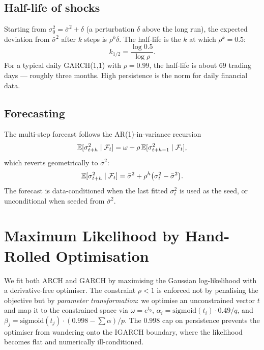 \subsection{Half-life of shocks}

Starting from $\sigma_0^2 = \bar\sigma^2 + \delta$ (a perturbation $\delta$
above the long run), the expected deviation from $\bar\sigma^2$ after $k$
steps is $\rho^k \delta$. The half-life is the $k$ at which $\rho^k = 0.5$:
\[
k_{1/2} = \frac{\log 0.5}{\log \rho}.
\]
For a typical daily GARCH(1,1) with $\rho = 0.99$, the half-life is about
$69$ trading days --- roughly three months. High persistence is the norm for
daily financial data.

\subsection{Forecasting}

The multi-step forecast follows the AR(1)-in-variance recursion
\[
\mathbb{E}[\sigma_{t+h}^2 \mid \mathcal{F}_t] = \omega + \rho \,
  \mathbb{E}[\sigma_{t+h-1}^2 \mid \mathcal{F}_t],
\]
which reverts geometrically to $\bar\sigma^2$:
\[
\mathbb{E}[\sigma_{t+h}^2 \mid \mathcal{F}_t] = \bar\sigma^2 + \rho^h
  \bigl(\sigma_t^2 - \bar\sigma^2\bigr).
\]
The forecast is data-conditioned when the last fitted $\sigma_t^2$ is used as
the seed, or unconditional when seeded from $\bar\sigma^2$.

\section{Maximum Likelihood by Hand-Rolled Optimisation}


We fit both ARCH and GARCH by maximising the Gaussian log-likelihood with a
derivative-free optimiser. The constraint $\rho < 1$ is enforced not by
penalising the objective but by \emph{parameter transformation}: we optimise
an unconstrained vector $t$ and map it to the constrained space via
$\omega = e^{t_0}$, $\alpha_i = \mathrm{sigmoid}(t_i) \cdot 0.49 / q$, and
$\beta_j = \mathrm{sigmoid}(t_j) \cdot (0.998 - \sum\alpha) / p$. The
$0.998$ cap on persistence prevents the optimiser from wandering onto the
IGARCH boundary, where the likelihood becomes flat and numerically
ill-conditioned.

